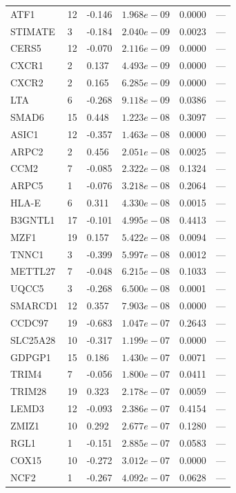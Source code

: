 \begin{longtable}{llllll}
  ATF1 & 12 & -0.146 & $1.968e-09$ & 0.0000 & --- \\
  STIMATE & 3 & -0.184 & $2.040e-09$ & 0.0023 & --- \\
  CERS5 & 12 & -0.070 & $2.116e-09$ & 0.0000 & --- \\
  CXCR1 & 2 & 0.137 & $4.493e-09$ & 0.0000 & --- \\
  CXCR2 & 2 & 0.165 & $6.285e-09$ & 0.0000 & --- \\
  LTA & 6 & -0.268 & $9.118e-09$ & 0.0386 & --- \\
  SMAD6 & 15 & 0.448 & $1.223e-08$ & 0.3097 & --- \\
  ASIC1 & 12 & -0.357 & $1.463e-08$ & 0.0000 & --- \\
  ARPC2 & 2 & 0.456 & $2.051e-08$ & 0.0025 & --- \\
  CCM2 & 7 & -0.085 & $2.322e-08$ & 0.1324 & --- \\
  ARPC5 & 1 & -0.076 & $3.218e-08$ & 0.2064 & --- \\
  HLA-E & 6 & 0.311 & $4.330e-08$ & 0.0015 & --- \\
  B3GNTL1 & 17 & -0.101 & $4.995e-08$ & 0.4413 & --- \\
  MZF1 & 19 & 0.157 & $5.422e-08$ & 0.0094 & --- \\
  TNNC1 & 3 & -0.399 & $5.997e-08$ & 0.0012 & --- \\
  METTL27 & 7 & -0.048 & $6.215e-08$ & 0.1033 & --- \\
  UQCC5 & 3 & -0.268 & $6.500e-08$ & 0.0001 & --- \\
  SMARCD1 & 12 & 0.357 & $7.903e-08$ & 0.0000 & --- \\
  CCDC97 & 19 & -0.683 & $1.047e-07$ & 0.2643 & --- \\
  SLC25A28 & 10 & -0.317 & $1.199e-07$ & 0.0000 & --- \\
  GDPGP1 & 15 & 0.186 & $1.430e-07$ & 0.0071 & --- \\
  TRIM4 & 7 & -0.056 & $1.800e-07$ & 0.0411 & --- \\
  TRIM28 & 19 & 0.323 & $2.178e-07$ & 0.0059 & --- \\
  LEMD3 & 12 & -0.093 & $2.386e-07$ & 0.4154 & --- \\
  ZMIZ1 & 10 & 0.292 & $2.677e-07$ & 0.1280 & --- \\
  RGL1 & 1 & -0.151 & $2.885e-07$ & 0.0583 & --- \\
  COX15 & 10 & -0.272 & $3.012e-07$ & 0.0000 & --- \\
  NCF2 & 1 & -0.267 & $4.092e-07$ & 0.0628 & --- \\

\end{longtable}
